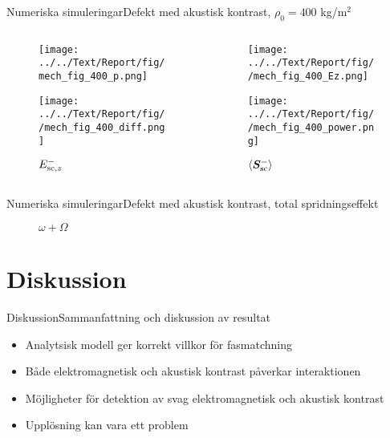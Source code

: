\documentclass[11pt]{beamer}
\begin{document}
	\begin{frame}{Numeriska simuleringar}{Defekt med akustisk kontrast, $\rho_0 = 400$ kg/m$^2$}
		\begin{columns}
			\begin{column}{0.5\textwidth}
				\begin{figure}
					\centering
					\begin{overprint}
						\texttt{[image: ../../Text/Report/fig/mech\_fig\_400\_p.png]}
						\caption*{$p$}
						
						\texttt{[image: ../../Text/Report/fig//mech\_fig\_400\_diff.png]}
						\caption*{$E_{\mathrm{sc}, z}^-$}
					\end{overprint}
				\end{figure}
			\end{column}
			\begin{column}{0.5\textwidth}
				\begin{figure}
					\centering
					\begin{overprint}
						\onslide<1>
						\texttt{[image: ../../Text/Report/fig//mech\_fig\_400\_Ez.png]}
						\caption*{$E_{\mrm{i}, z}$}
						
						\onslide<2>
						\texttt{[image: ../../Text/Report/fig//mech\_fig\_400\_power.png]}
						\caption*{$\left< \bm{S}_{\mathrm{sc}}^- \right>$}
					\end{overprint}
				\end{figure}
			\end{column}
		\end{columns}
	\end{frame}
	
	\begin{frame}{Numeriska simuleringar}{Defekt med akustisk kontrast, total spridningseffekt}
		\begin{figure}
			\centering
			\resizebox{!}{0.8\textheight}{}
			\caption*{$\omega + \Omega$}
		\end{figure}
	\end{frame}
	
	\section{Diskussion}
	
	\begin{frame}{Diskussion}{Sammanfattning och diskussion av resultat}
		\begin{itemize}
			\item Analytsisk modell ger korrekt villkor för fasmatchning
			\pause
			\item Både elektromagnetisk och akustisk kontrast påverkar interaktionen
			\pause
			\item Möjligheter för detektion av svag elektromagnetisk och akustisk kontrast
			\pause
			\item Upplösning kan vara ett problem
		\end{itemize}
	\end{frame}
	
\end{document}
